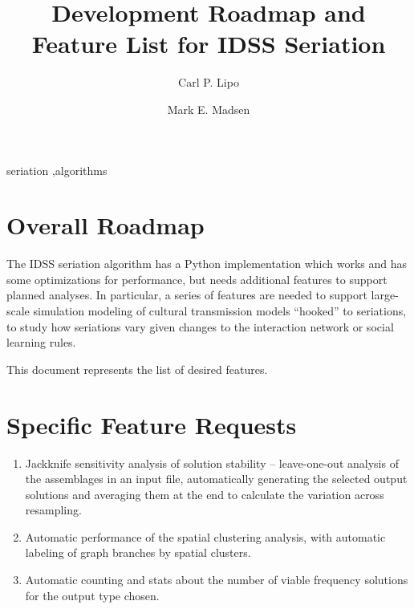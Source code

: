 \documentclass[preprint,times,authoryear,10pt]{elsarticle}
\begin{document}
\begin{frontmatter}


\title{Development Roadmap and Feature List for IDSS Seriation}

\author{Carl P. Lipo}
\address{Department of Anthropology and IIRMES, 1250 Bellflower Blvd, California State University at Long Beach, Long Beach CA, 90840 USA}

\author{Mark E. Madsen}
\address{Department of Anthropology, Box 353100, University of Washington, Seattle WA, 98195 USA}



\begin{keyword}
seriation \sep algorithms
\end{keyword}


\end{frontmatter}

\section{Overall Roadmap}\label{overall-roadmap}

The IDSS seriation algorithm has a Python implementation which works and
has some optimizations for performance, but needs additional features to
support planned analyses. In particular, a series of features are needed
to support large-scale simulation modeling of cultural transmission
models ``hooked'' to seriations, to study how seriations vary given
changes to the interaction network or social learning rules.

This document represents the list of desired features.

\section{Specific Feature Requests}\label{specific-feature-requests}

\begin{enumerate}
\def\labelenumi{\arabic{enumi}.}
\itemsep1pt\parskip0pt
\item
  Jackknife sensitivity analysis of solution stability -- leave-one-out
  analysis of the assemblages in an input file, automatically generating
  the selected output solutions and averaging them at the end to
  calculate the variation across resampling.
\item
  Automatic performance of the spatial clustering analysis, with
  automatic labeling of graph branches by spatial clusters.
\item
  Automatic counting and stats about the number of viable frequency
  solutions for the output type chosen.
\end{enumerate}
\end{document}
